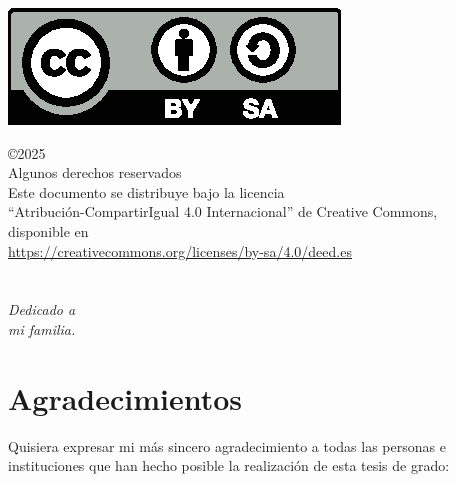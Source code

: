 \documentclass[a4paper, 12pt]{book}
\makeatletter
\let\theauthor\@author
\makeatother
\begin{document}
\vspace{12cm}


\begin{flushright}
\includegraphics[scale=0.6]{img/by-sa}

\noindent©2025 \theauthor  \\
Algunos derechos reservados  \\
Este documento se distribuye bajo la licencia \\
``Atribución-CompartirIgual 4.0 Internacional'' de Creative Commons, \\
disponible en \\
\url{https://creativecommons.org/licenses/by-sa/4.0/deed.es}
\end{flushright}


\chapter*{}
\begin{flushright}
\textit{Dedicado a \\
mi familia.}
\end{flushright}


\chapter*{Agradecimientos}

Quisiera expresar mi más sincero agradecimiento a todas las personas e instituciones que han hecho posible la realización de esta tesis de grado:
\end{document}

